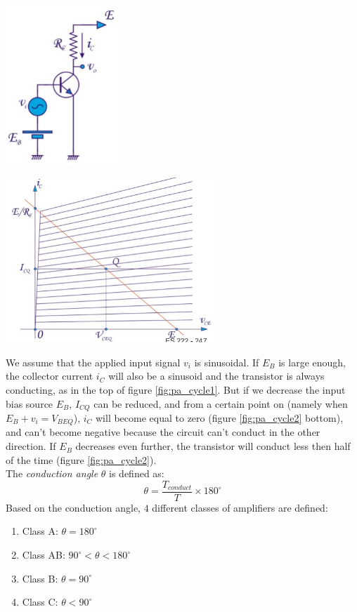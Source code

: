 \begin{minipage}{.5\textwidth}
	\centering
	\includegraphics[height=6cm]{figures/ch09/pa_circuit1.jpg}
	\label{fig:pa_circuit1}
\end{minipage}%
\begin{minipage}{.5\textwidth}
	\centering
	\includegraphics[width=8cm]{figures/ch09/pa_circuit2.jpg}
	\label{fig:pa_circuit2}
\end{minipage}

We assume that the applied input signal $v_i$ is sinusoidal. If $E_B$ is large enough, the collector current $i_C$ will also be a sinusoid and the transistor is always conducting, as in the top of figure \ref{fig:pa_cycle1}. But if we decrease the input bias source $E_B$, $I_{CQ}$ can be reduced, and from a certain point on (namely when $E_B + v_i = V_{BEQ}$), $i_C$ will become equal to zero (figure \ref{fig:pa_cycle2} bottom), and can't become negative because the circuit can't conduct in the other direction. If $E_B$ decreases even further, the transistor will conduct less then half of the time (figure \ref{fig:pa_cycle2}).\\
The \emph{conduction angle} $\theta$ is defined as:
\begin{equation}
	\theta = \frac{T_{conduct}}{T} \times 180^{\circ} 
	\label{eq:condcution_angle}
\end{equation}
Based on the conduction angle, $4$ different classes of amplifiers are defined:
\begin{enumerate}
	\item Class A: $\theta = 180^{\circ} $
	\item Class AB: $90^{\circ} < \theta < 180^{\circ} $
	\item Class B: $\theta = 90^{\circ} $
	\item Class C: $\theta < 90^{\circ} $
\end{enumerate}


